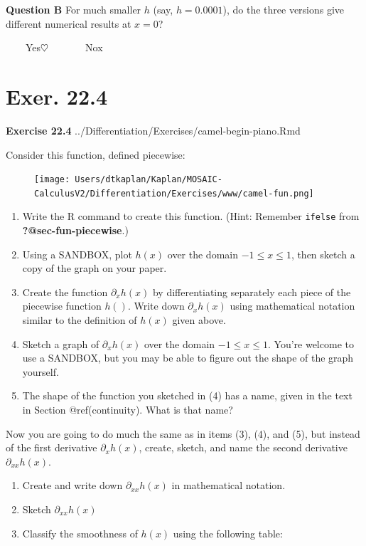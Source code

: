 \documentclass[
  letterpaper,
  DIV=11,
  numbers=noendperiod,
  oneside]{article}
\begin{document}
\begin{multicols}{2}
\textbf{Question B} For much smaller \(h\) (say, \(h=0.0001\)), do the
three versions give different numerical results at \(x=0\)?

~~~~{Yes{\(\heartsuit\ \)}}~~~~~~~{No{x}}

\hypertarget{exer.-22.4}{%
\section*{Exer. 22.4}\label{exer.-22.4}}

\textbf{Exercise 22.4}
../Differentiation/Exercises/camel-begin-piano.Rmd

Consider this function, defined piecewise:

\begin{figure}

{\centering \texttt{[image: Users/dtkaplan/Kaplan/MOSAIC-CalculusV2/Differentiation/Exercises/www/camel-fun.png]}

}

\end{figure}

\begin{enumerate}
\def\labelenumi{\arabic{enumi}.}
\item
  Write the R command to create this function. (Hint: Remember
  \texttt{ifelse} from \textbf{?@sec-fun-piecewise}.)
\item
  Using a SANDBOX, plot \(h(x)\) over the domain \(-1 \leq x \leq 1\),
  then sketch a copy of the graph on your paper.
\item
  Create the function \(\partial_x h(x)\) by differentiating separately
  each piece of the piecewise function \(h()\). Write down
  \(\partial_x h(x)\) using mathematical notation similar to the
  definition of \(h(x)\) given above.
\item
  Sketch a graph of \(\partial_x h(x)\) over the domain
  \(-1 \leq x \leq 1\). You're welcome to use a SANDBOX, but you may be
  able to figure out the shape of the graph yourself.
\item
  The shape of the function you sketched in (4) has a name, given in the
  text in Section @ref(continuity). What is that name?
\end{enumerate}

Now you are going to do much the same as in items (3), (4), and (5), but
instead of the first derivative \(\partial_x h(x)\), create, sketch, and
name the second derivative \(\partial_{xx} h(x)\).

\begin{enumerate}
\def\labelenumi{\arabic{enumi}.}
\setcounter{enumi}{5}
\item
  Create and write down \(\partial_{xx} h(x)\) in mathematical notation.
\item
  Sketch \(\partial_{xx} h(x)\)
\item
  Classify the smoothness of \(h(x)\) using the following table:
\end{enumerate}


\end{multicols}
\end{document}
